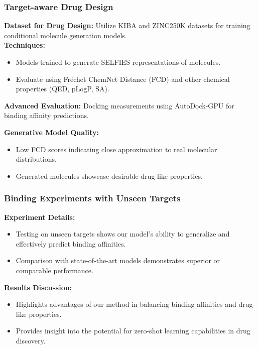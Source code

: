 \documentclass[11pt,xcolor={dvipsnames},hyperref={pdftex,pdfpagemode=UseNone,hidelinks,pdfdisplaydoctitle=true},usepdftitle=false]{beamer}
\begin{document}
\begin{frame}
\frametitle{Target-aware Drug Design}
\textbf{Dataset for Drug Design:} Utilize KIBA and ZINC250K datasets for training conditional molecule generation models. \\
\textbf{Techniques:}
\begin{itemize}
    \item Models trained to generate SELFIES representations of molecules.
    \item Evaluate using Fréchet ChemNet Distance (FCD) and other chemical properties (QED, pLogP, SA).
\end{itemize}
\textbf{Advanced Evaluation:} Docking measurements using AutoDock-GPU for binding affinity predictions.

\textbf{Generative Model Quality:}
\begin{itemize}
    \item Low FCD scores indicating close approximation to real molecular distributions.
    \item Generated molecules showcase desirable drug-like properties.
\end{itemize}
\end{frame}

\begin{frame}
\frametitle{Binding Experiments with Unseen Targets}
\textbf{Experiment Details:}
\begin{itemize}
    \item Testing on unseen targets shows our model's ability to generalize and effectively predict binding affinities.
    \item Comparison with state-of-the-art models demonstrates superior or comparable performance.
\end{itemize}
\textbf{Results Discussion:}
\begin{itemize}
    \item Highlights advantages of our method in balancing binding affinities and drug-like properties.
    \item Provides insight into the potential for zero-shot learning capabilities in drug discovery.
\end{itemize}
\end{frame}
\end{document}
